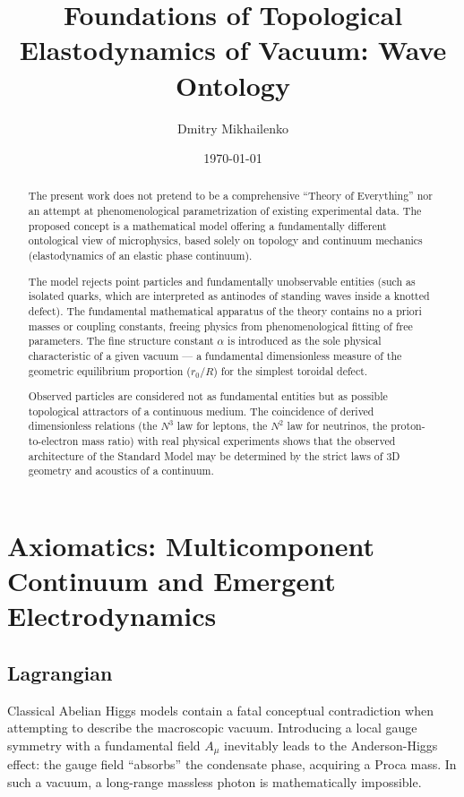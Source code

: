\documentclass[11pt,a4paper]{article}
\title{\textbf{Foundations of Topological Elastodynamics of Vacuum: Wave Ontology}}
\author{Dmitry Mikhailenko}
\date{\today}
\begin{document}
\maketitle

\begin{abstract}
The present work does not pretend to be a comprehensive ``Theory of Everything'' nor an attempt at phenomenological parametrization of existing experimental data. The proposed concept is a mathematical model offering a fundamentally different ontological view of microphysics, based solely on topology and continuum mechanics (elastodynamics of an elastic phase continuum).

The model rejects point particles and fundamentally unobservable entities (such as isolated quarks, which are interpreted as antinodes of standing waves inside a knotted defect). The fundamental mathematical apparatus of the theory contains no a priori masses or coupling constants, freeing physics from phenomenological fitting of free parameters. The fine structure constant $\alpha$ is introduced as the sole physical characteristic of a given vacuum — a fundamental dimensionless measure of the geometric equilibrium proportion ($r_0/R$) for the simplest toroidal defect.

Observed particles are considered not as fundamental entities but as possible topological attractors of a continuous medium. The coincidence of derived dimensionless relations (the $N^3$ law for leptons, the $N^2$ law for neutrinos, the proton-to-electron mass ratio) with real physical experiments shows that the observed architecture of the Standard Model may be determined by the strict laws of 3D geometry and acoustics of a continuum.
\end{abstract}

\section{Axiomatics: Multicomponent Continuum and Emergent Electrodynamics}

\subsection{Lagrangian}
Classical Abelian Higgs models contain a fatal conceptual contradiction when attempting to describe the macroscopic vacuum. Introducing a local gauge symmetry with a fundamental field $A_\mu$ inevitably leads to the Anderson-Higgs effect: the gauge field ``absorbs'' the condensate phase, acquiring a Proca mass. In such a vacuum, a long-range massless photon is mathematically impossible.
\end{document}
